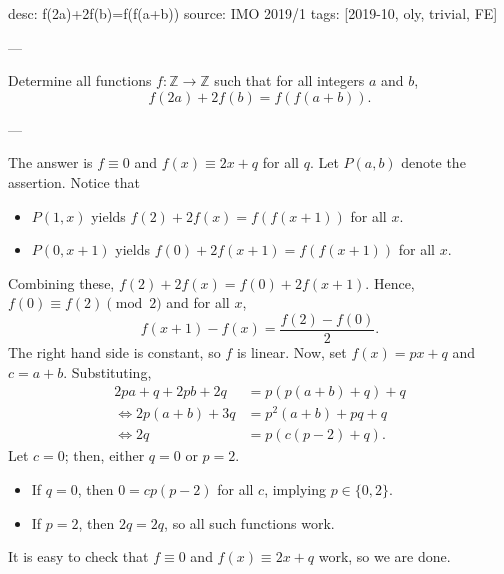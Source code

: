 desc: f(2a)+2f(b)=f(f(a+b))
source: IMO 2019/1
tags: [2019-10, oly, trivial, FE]

---

Determine all functions $f:\mathbb Z\to\mathbb Z$ such that for all integers $a$ and $b$, \[f(2a)+2f(b)=f(f(a+b)).\]

---

The answer is $f\equiv0$ and $f(x)\equiv2x+q$ for all $q$. Let $P(a,b)$ denote the assertion. Notice that
\begin{itemize}
    \item $P(1,x)$ yields $f(2)+2f(x)=f(f(x+1))$ for all $x$.
        \vspace{-0.5em}
    \item $P(0,x+1)$ yields $f(0)+2f(x+1)=f(f(x+1))$ for all $x$.
\end{itemize}
Combining these, $f(2)+2f(x)=f(0)+2f(x+1)$. Hence, $f(0)\equiv f(2)\pmod2$ and for all $x$, \[f(x+1)-f(x)=\frac{f(2)-f(0)}2.\]
The right hand side is constant, so $f$ is linear. Now, set $f(x)=px+q$ and $c=a+b$. Substituting,
\begin{align*}
    2pa+q+2pb+2q&=p(p(a+b)+q)+q\\
    \iff2p(a+b)+3q&=p^2(a+b)+pq+q\\
    \iff2q&=p(c(p-2)+q).
\end{align*}
Let $c=0$; then, either $q=0$ or $p=2$.
\begin{itemize}
    \item If $q=0$, then $0=cp(p-2)$ for all $c$, implying $p\in\{0,2\}$.
        \vspace{-0.5em}
    \item If $p=2$, then $2q=2q$, so all such functions work.
\end{itemize}
It is easy to check that $f\equiv0$ and $f(x)\equiv2x+q$ work, so we are done.
